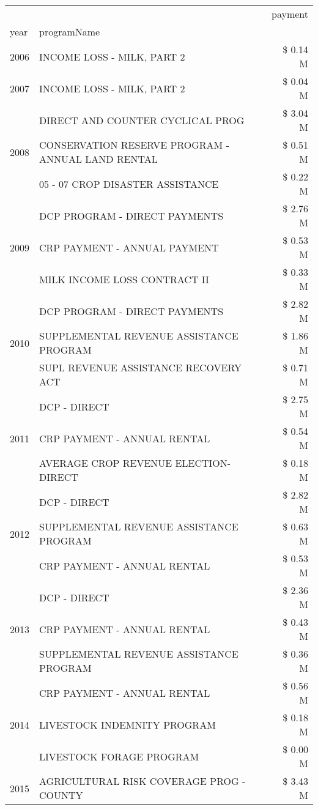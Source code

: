 \begin{tabular}{llr}
\toprule
 &  & payment \\
year & programName &  \\
\midrule
2006 & INCOME LOSS - MILK, PART 2 & \$ 0.14 M \\
\cline{1-3}
2007 & INCOME LOSS - MILK, PART 2 & \$ 0.04 M \\
\cline{1-3}
\multirow[t]{3}{*}{2008} & DIRECT AND COUNTER CYCLICAL PROG & \$ 3.04 M \\
 & CONSERVATION RESERVE PROGRAM - ANNUAL LAND RENTAL & \$ 0.51 M \\
 & 05 - 07 CROP DISASTER ASSISTANCE & \$ 0.22 M \\
\cline{1-3}
\multirow[t]{3}{*}{2009} & DCP PROGRAM - DIRECT PAYMENTS & \$ 2.76 M \\
 & CRP PAYMENT - ANNUAL PAYMENT & \$ 0.53 M \\
 & MILK INCOME LOSS CONTRACT II & \$ 0.33 M \\
\cline{1-3}
\multirow[t]{3}{*}{2010} & DCP PROGRAM - DIRECT PAYMENTS & \$ 2.82 M \\
 & SUPPLEMENTAL REVENUE ASSISTANCE PROGRAM & \$ 1.86 M \\
 & SUPL REVENUE ASSISTANCE RECOVERY ACT & \$ 0.71 M \\
\cline{1-3}
\multirow[t]{3}{*}{2011} & DCP - DIRECT & \$ 2.75 M \\
 & CRP PAYMENT - ANNUAL RENTAL & \$ 0.54 M \\
 & AVERAGE CROP REVENUE ELECTION-DIRECT & \$ 0.18 M \\
\cline{1-3}
\multirow[t]{3}{*}{2012} & DCP - DIRECT & \$ 2.82 M \\
 & SUPPLEMENTAL REVENUE ASSISTANCE PROGRAM & \$ 0.63 M \\
 & CRP PAYMENT - ANNUAL RENTAL & \$ 0.53 M \\
\cline{1-3}
\multirow[t]{3}{*}{2013} & DCP - DIRECT & \$ 2.36 M \\
 & CRP PAYMENT - ANNUAL RENTAL & \$ 0.43 M \\
 & SUPPLEMENTAL REVENUE ASSISTANCE PROGRAM & \$ 0.36 M \\
\cline{1-3}
\multirow[t]{3}{*}{2014} & CRP PAYMENT - ANNUAL RENTAL & \$ 0.56 M \\
 & LIVESTOCK INDEMNITY PROGRAM & \$ 0.18 M \\
 & LIVESTOCK FORAGE PROGRAM & \$ 0.00 M \\
\cline{1-3}
\multirow[t]{3}{*}{2015} & AGRICULTURAL RISK COVERAGE PROG - COUNTY & \$ 3.43 M \\

\end{tabular}
